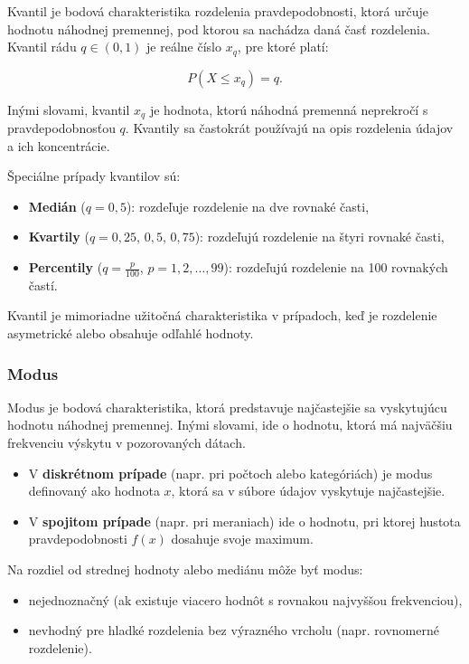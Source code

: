Kvantil je bodová charakteristika rozdelenia pravdepodobnosti, ktorá určuje hodnotu náhodnej premennej, pod ktorou sa nachádza daná časť rozdelenia. Kvantil rádu $q \in (0,1)$ je reálne číslo $x_q$, pre ktoré platí:

\begin{equation}
P(X \leq x_q) = q.
\end{equation}

Inými slovami, kvantil $x_q$ je hodnota, ktorú náhodná premenná neprekročí s pravdepodobnosťou $q$. Kvantily sa častokrát používajú na opis rozdelenia údajov a ich koncentrácie.

Špeciálne prípady kvantilov sú:
\begin{itemize}
  \item \textbf{Medián} ($q = 0{,}5$): rozdeľuje rozdelenie na dve rovnaké časti,
  \item \textbf{Kvartily} ($q = 0{,}25$, $0{,}5$, $0{,}75$): rozdeľujú rozdelenie na štyri rovnaké časti,
  \item \textbf{Percentily} ($q = \frac{p}{100}$, $p = 1, 2, \dots, 99$): rozdeľujú rozdelenie na 100 rovnakých častí.
\end{itemize}

Kvantil je mimoriadne užitočná charakteristika v prípadoch, keď je rozdelenie asymetrické alebo obsahuje odľahlé hodnoty.

\subsubsection{Modus}\label{subsubsection:modus}

Modus je bodová charakteristika, ktorá predstavuje najčastejšie sa vyskytujúcu hodnotu náhodnej premennej. Inými slovami, ide o hodnotu, ktorá má najväčšiu frekvenciu výskytu v pozorovaných dátach.

\begin{itemize}
  \item V \textbf{diskrétnom prípade} (napr. pri počtoch alebo kategóriách) je modus definovaný ako hodnota $x$, ktorá sa v súbore údajov vyskytuje najčastejšie.
  \item V \textbf{spojitom prípade} (napr. pri meraniach) ide o hodnotu, pri ktorej hustota pravdepodobnosti $f(x)$ dosahuje svoje maximum.
\end{itemize}

Na rozdiel od strednej hodnoty alebo mediánu môže byť modus:
\begin{itemize}
  \item nejednoznačný (ak existuje viacero hodnôt s rovnakou najvyššou frekvenciou),
  \item nevhodný pre hladké rozdelenia bez výrazného vrcholu (napr. rovnomerné rozdelenie).
\end{itemize}

